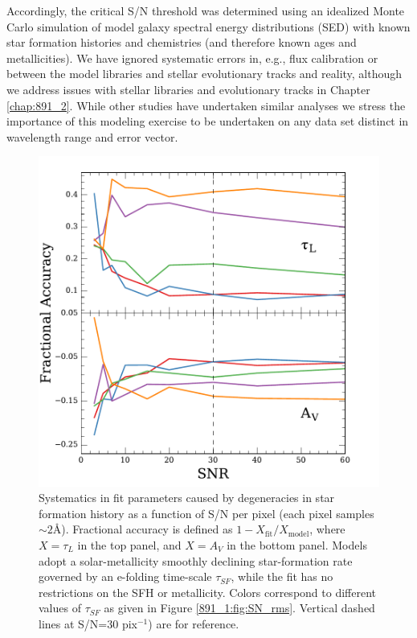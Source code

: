 Accordingly, the critical S/N threshold was determined using an
idealized Monte Carlo simulation of model galaxy spectral energy
distributions (SED) with known star formation histories and
chemistries (and therefore known ages and metallicities).  We have
ignored systematic errors in, e.g., flux calibration or between the
model libraries and stellar evolutionary tracks and reality, although
we address issues with stellar libraries and evolutionary tracks in
Chapter \ref{chap:891_2}. While other studies have undertaken similar
analyses we stress the importance of this modeling exercise to be
undertaken on any data set distinct in wavelength range and error
vector.

\begin{figure}
  \centering
  \includegraphics[width=\columnwidth]{891_1/figs/SN_sys.pdf}

  \caption[Systematics in model galaxies used for S/N
  determination]{\label{891_1:fig:SN_sys}\fixspacing Systematics in fit
    parameters caused by degeneracies in star formation history as a
    function of S/N per pixel (each pixel samples $\sim 2$\AA).
    Fractional accuracy is defined as $1 -
    X_\mathrm{fit}/X_\mathrm{model}$, where $X = \tau_L$ in the top
    panel, and $X = A_V$ in the bottom panel.  Models adopt a
    solar-metallicity smoothly declining star-formation rate governed
    by an e-folding time-scale $\tau_{SF}$, while the fit has no
    restrictions on the SFH or metallicity. Colors correspond to
    different values of $\tau_{SF}$ as given in Figure
    \ref{891_1:fig:SN_rms}. Vertical dashed lines at S/N=30 pix$^{-1}$) are
    for reference.}
\end{figure}


